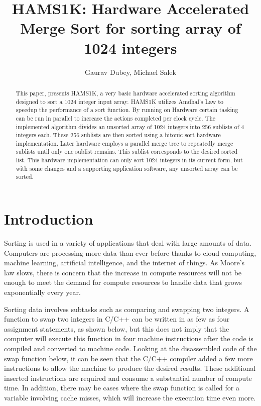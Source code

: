 \documentclass{article}
\title{HAMS1K: Hardware Accelerated Merge Sort for sorting array of 1024 integers}
\author{Gaurav Dubey, Michael Salek}
\begin{document}
\maketitle

\begin{abstract}
This paper, presents HAMS1K, a very basic hardware accelerated sorting algorithm designed to sort a 1024 integer input array. HAMS1K utilizes Amdhal's Law to speedup the performance of a sort function. By running on Hardware certain tasking can be run in parallel to increase the actions completed per clock cycle. The implemented algorithm divides an unsorted array of 1024 integers into 256 sublists of 4 integers each. These 256 sublists are then sorted using a bitonic sort hardware implementation. Later hardware employs a parallel merge tree to repeatedly merge sublists until only one sublist remains. This sublist corresponds to the desired sorted list. This hardware implementation can only sort 1024 integers in its current form, but with some changes and a supporting application software, any unsorted array can be sorted. 
\end{abstract}

\section{Introduction}

Sorting is used in a variety of applications that deal with large amounts of data. Computers are processing more data than ever before thanks to cloud computing, machine learning, artificial intelligence, and the internet of things. As Moore's law slows, there is concern that the increase in compute resources will not be enough to meet the demand for compute resources to handle data that grows exponentially every year.

Sorting data involves subtasks such as comparing and swapping two integers. A function to swap two integers in C/C++ can be written in as few as four assignment statements, as shown below, but this does not imply that the computer will execute this function in four machine instructions after the code is compiled and converted to machine code. Looking at the disassembled code of the swap function below, it can be seen that the C/C++ compiler added a few more instructions to allow the machine to produce the desired results. These additional inserted instructions are required and consume a substantial number of compute time. In addition, there may be cases where the swap function is called for a variable involving cache misses, which will increase the execution time even more. 
\end{document}
